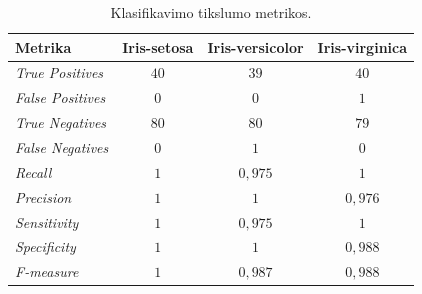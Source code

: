 \begin{table}[H]
    \centering
    \caption{Klasifikavimo tikslumo metrikos.}
    \begin{tabular}{|l|c|c|c|}
        \hline
        \textbf{Metrika} & \textbf{Iris-setosa} & \textbf{Iris-versicolor} & \textbf{Iris-virginica} \\
        \hline
        \textit{True Positives}   & $40$ & $39$ & $40$ \\ \hline
        \textit{False Positives}  & $0$  & $0$  & $1$  \\ \hline
        \textit{True Negatives}   & $80$ & $80$ & $79$ \\ \hline
        \textit{False Negatives}  & $0$  & $1$  & $0$  \\ \hline
        \textit{Recall}           & $1$ & $0{,}975$ & $1$ \\ \hline
        \textit{Precision}        & $1$ & $1$       & $0{,}976$ \\ \hline
        \textit{Sensitivity}      & $1$ & $0{,}975$ & $1$ \\ \hline
        \textit{Specificity}      & $1$ & $1$       & $0{,}988$ \\ \hline
        \textit{F-measure}        & $1$ & $0{,}987$ & $0{,}988$ \\ \hline
    \end{tabular}
    \label{tab:mokymo_klasifikavimo_metrikos}
\end{table}